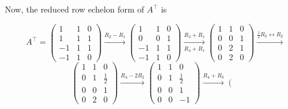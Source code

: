 \documentclass{article}
\begin{document}
\begin{enumerate}
    Now, the reduced row echelon form of $A^\top$ is 
    
    \begin{equation*}
    A^\top = \left(
            \begin{array}{rrr}
                1 & 1 & 0\\
                1 & 1 & 1\\
                -1 & 1 & 1\\
                -1 & 1 & 0
            \end{array}
        \right)
        \overset{R_2-R_1}{\longrightarrow}
        \left(
            \begin{array}{rrr}
                1 & 1 & 0\\
                0 & 0 & 1\\
                -1 & 1 & 1\\
                -1 & 1 & 0
            \end{array}
        \right)
        \overset{R_3+R_1}{\underset{R_4+R_1}\longrightarrow}
        \left(
            \begin{array}{rrr}
                1 & 1 & 0\\
                0 & 0 & 1\\
                0 & 2 & 1\\
                0 & 2 & 0
            \end{array}
        \right)
        \overset{\frac{1}{2} R_3 \leftrightarrow R_2}{\longrightarrow}
    \end{equation*}
    \begin{equation*}
        \left(
            \begin{array}{rrr}
                1 & 1 & 0\\
                0 & 1 & \frac{1}{2}\\
                0 & 0 & 1\\
                0 & 2 & 0
            \end{array}
        \right)
        \overset{R_4-2R_2}{\longrightarrow}
        \left(
            \begin{array}{rrr}
                1 & 1 & 0\\
                0 & 1 & \frac{1}{2}\\
                0 & 0 & 1\\
                0 & 0 & -1
            \end{array}
        \right)
        \overset{R_4+R_3}{\longrightarrow}
        \left(
            \begin{array}{rrr}

\end{array}
\end{equation*}
\end{enumerate}
\end{document}
